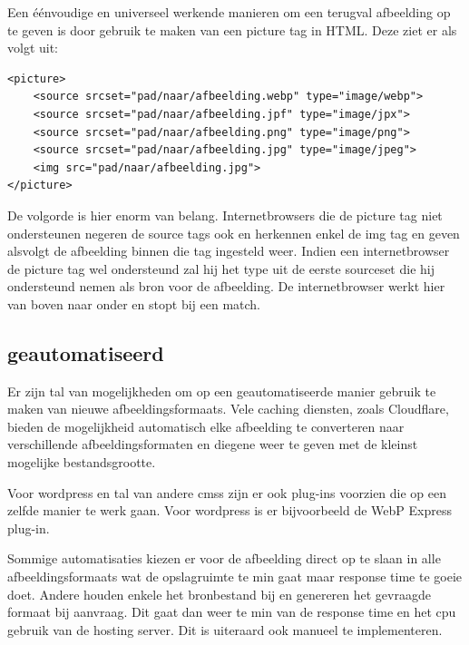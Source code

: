 Een éénvoudige en universeel werkende manieren om een terugval afbeelding op te geven is door gebruik te maken van een picture tag in HTML. Deze ziet er als volgt uit:

\begin{lstlisting}[style=htmlcssjs]
<picture>
	<source srcset="pad/naar/afbeelding.webp" type="image/webp">
	<source srcset="pad/naar/afbeelding.jpf" type="image/jpx">
	<source srcset="pad/naar/afbeelding.png" type="image/png"> 
	<source srcset="pad/naar/afbeelding.jpg" type="image/jpeg"> 
	<img src="pad/naar/afbeelding.jpg">
</picture>
\end{lstlisting}

De volgorde is hier enorm van belang. Internetbrowsers die de picture tag niet ondersteunen negeren de source tags ook en herkennen enkel de img tag en geven alsvolgt de afbeelding binnen die tag ingesteld weer. Indien een internetbrowser de picture tag wel ondersteund zal hij het type uit de eerste sourceset die hij ondersteund nemen als bron voor de afbeelding. De internetbrowser werkt hier van boven naar onder en stopt bij een match.

\subsection{geautomatiseerd}
\label{sec:afbeeldingscompressie-implementatie-web-automated}

Er zijn tal van mogelijkheden om op een geautomatiseerde manier gebruik te maken van nieuwe \glspl{afbeeldingsformaat}. Vele caching diensten, zoals Cloudflare, bieden de mogelijkheid automatisch elke afbeelding te converteren naar verschillende afbeeldingsformaten en diegene weer te geven met de kleinst mogelijke bestandsgrootte. 

Voor \gls{wordpress} en tal van andere \glspl{cms} zijn er ook \glspl{plug-in} voorzien die op een zelfde manier te werk gaan. Voor \gls{wordpress} is er bijvoorbeeld de WebP Express  \gls{plug-in}.

Sommige automatisaties kiezen er voor de afbeelding direct op te slaan in alle \glspl{afbeeldingsformaat} wat de opslagruimte te min gaat maar response time te goeie doet. Andere houden enkele het bronbestand bij en genereren het gevraagde formaat bij aanvraag. Dit gaat dan weer te min van de response time en het cpu gebruik van de \gls{hosting} server. Dit is uiteraard ook manueel te implementeren.

